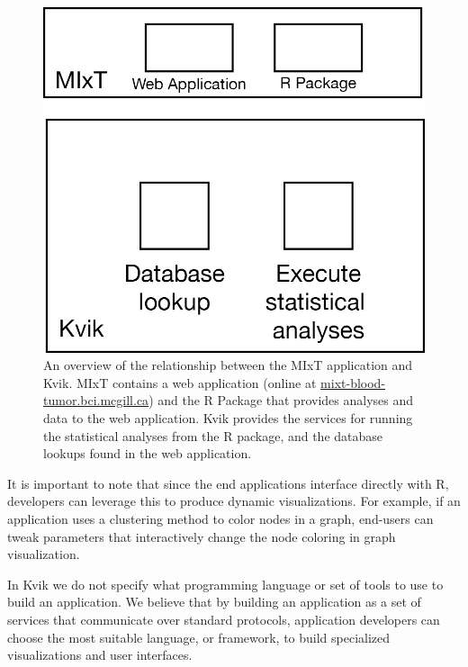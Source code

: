 \begin{figure}[h!]
\centering
\includegraphics{figures/kvik-mixt.png}
\caption{An overview of the relationship between the MIxT application and Kvik.
MIxT contains a web application (online at \url{mixt-blood-tumor.bci.mcgill.ca})
and the R Package that provides analyses and data to the web application. Kvik
provides the services for running the statistical analyses from the R package,
and the database lookups found in the web application.} 
\label{kvik-mixt}
\end{figure} 

It is important to note that since the end applications interface directly with
R, developers can leverage this to produce dynamic visualizations. For example,
if an application uses a clustering method to color nodes in a graph, end-users
can tweak parameters that interactively change the node coloring in graph
visualization.


In Kvik we do not specify what programming language or set of tools to use to
build an application. We believe that by building an application as a set of
services that communicate over standard protocols, application developers can
choose the most suitable language, or framework, to build specialized
visualizations and user interfaces. 

